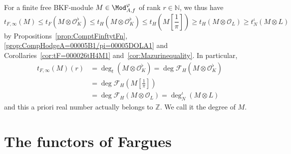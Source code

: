 \begin{rema}
For a finite free BKF-module $M\in\Mod_{A,f}^{\varphi}$ of rank $r\in\mathbb{N}$, we thus have
\[
t_{F,\infty}(M)\leq t_{F}(M\otimes\mathcal{O}_{K}^{\flat})\leq t_{H}(M\otimes\mathcal{O}_{K}^{\flat})\leq t_{H}\!\left(M\!\left[{\frac{1}{\pi}}\right]\right)\geq t_{H}(M\otimes\mathcal{O}_{L})\geq t_{N}^{\iota}(M\otimes L)
\]
by Propositions~\ref{prop:ComptFinftytFn}, \ref{prop:CompHodgeA=00005B1/pi=00005DOLA1} and Corollaries~\ref{cor:tF=000026tH4M1} and~\ref{cor:Mazurinequality}. In particular,
\[
\begin{aligned}t_{F,\infty}(M)(r) & =\deg_{t}(M\otimes\mathcal{O}_{K}^{\flat})=\deg\mathcal{F}_{H}(M\otimes\mathcal{O}_{K}^{\flat})\\
& =\deg\mathcal{F}_{H}\!\left(M\!\left[\frac{1}{\pi}\right]\right)\\
& =\deg\mathcal{F}_{H}(M\otimes\mathcal{O}_{L})=\deg_{N}^{\iota}(M\otimes L)
\end{aligned}
\]
and this a priori real number actually belongs to $\mathbb{Z}$. We call it the degree of $M$.
\end{rema}


\section{The functors of Fargues}\label{sec:FunctorsOfFargues}

